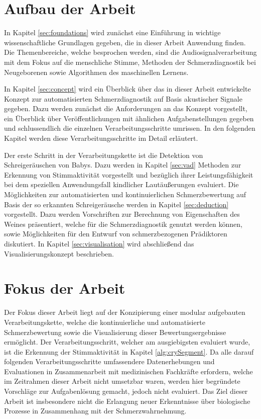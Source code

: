 \section{Aufbau der Arbeit}

In Kapitel \ref{sec:foundations} wird zunächst eine Einführung in wichtige wissenschaftliche Grundlagen gegeben, die in dieser Arbeit Anwendung finden. Die Themenbereiche, welche besprochen werden, sind die Audiosignalverarbeitung mit dem Fokus auf die menschliche Stimme, Methoden der Schmerzdiagnostik bei Neugeborenen sowie Algorithmen des maschinellen Lernens. 

In Kapitel \ref{sec:concept} wird ein Überblick über das in dieser Arbeit entwickelte Konzept zur automatisierten Schmerzdiagnostik auf Basis akustischer Signale gegeben. Dazu werden zunächst die Anforderungen an das Konzept vorgestellt, ein Überblick über Veröffentlichungen mit ähnlichen Aufgabenstellungen gegeben und schlussendlich die einzelnen Verarbeitungsschritte umrissen. In den folgenden Kapitel werden diese Verarbeitungsschritte im Detail erläutert. 

Der erste Schritt in der Verarbeitungskette ist die Detektion von Schreigeräuschen von Babys. Dazu werden in Kapitel \ref{sec:vad} Methoden zur Erkennung von Stimmaktivität vorgestellt und bezüglich ihrer Leistungsfähigkeit bei dem speziellen Anwendungsfall kindlicher Lautäußerungen evaluiert. Die Möglichkeiten zur automatisierten und kontinuierlichen Schmerzbewertung auf Basis der so erkannten Schreigeräusche werden in Kapitel \ref{sec:deduction} vorgestellt. Dazu werden Vorschriften zur Berechnung von Eigenschaften des Weines präsentiert, welche für die Schmerzdiagnostik genutzt werden können, sowie Möglichkeiten für den Entwurf von schmerzbezogenen Prädiktoren diskutiert. In Kapitel \ref{sec:visualisation} wird abschließend das Visualisierungskonzept beschrieben.

\section{Fokus der Arbeit}

Der Fokus dieser Arbeit liegt auf der Konzipierung einer modular aufgebauten Verarbeitungskette, welche die kontinuierliche und automatisierte Schmerzbewertung sowie die Visualisierung dieser Bewertungsergebnisse ermöglicht. Der Verarbeitungsschritt, welcher am ausgiebigsten evaluiert wurde, ist die Erkennung der Stimmaktivität in Kapitel \ref{alg:crySegment}. Da alle darauf folgenden Verarbeitungsschritte umfassendere Datenerhebungen und Evaluationen in Zusammenarbeit mit medizinischen Fachkräfte erfordern, welche im Zeitrahmen dieser Arbeit nicht umsetzbar waren, werden hier begründete Vorschläge zur Aufgabenlösung gemacht, jedoch nicht evaluiert. Das Ziel dieser Arbeit ist insbesondere nicht die Erlangung neuer Erkenntnisse über biologische Prozesse in Zusammenhang mit der Schmerzwahrnehmung.